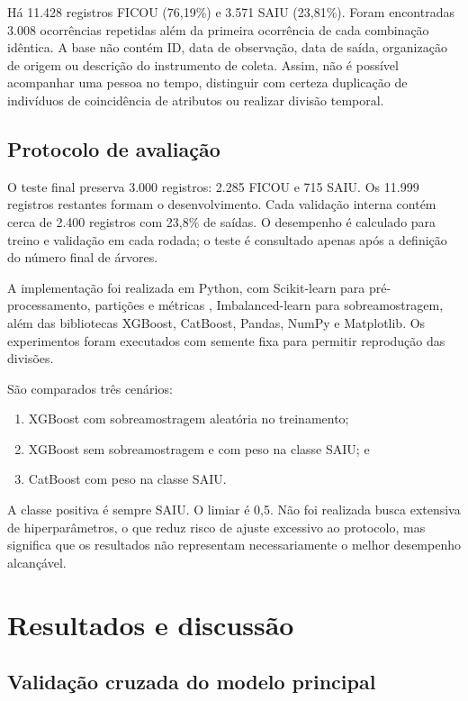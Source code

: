 \documentclass[12pt]{article}
\begin{document}
Há 11.428 registros FICOU (76,19\%) e 3.571 SAIU (23,81\%). Foram encontradas 3.008 ocorrências repetidas além da primeira ocorrência de cada combinação idêntica. A base não contém ID, data de observação, data de saída, organização de origem ou descrição do instrumento de coleta. Assim, não é possível acompanhar uma pessoa no tempo, distinguir com certeza duplicação de indivíduos de coincidência de atributos ou realizar divisão temporal.

\subsection{Protocolo de avaliação}

O teste final preserva 3.000 registros: 2.285 FICOU e 715 SAIU. Os 11.999 registros restantes formam o desenvolvimento. Cada validação interna contém cerca de 2.400 registros com 23,8\% de saídas. O desempenho é calculado para treino e validação em cada rodada; o teste é consultado apenas após a definição do número final de árvores.

A implementação foi realizada em Python, com Scikit-learn para pré-processamento, partições e métricas \cite{pedregosa2011scikit}, Imbalanced-learn para sobreamostragem, além das bibliotecas XGBoost, CatBoost, Pandas, NumPy e Matplotlib. Os experimentos foram executados com semente fixa para permitir reprodução das divisões.

São comparados três cenários:

\begin{enumerate}
    \item XGBoost com sobreamostragem aleatória no treinamento;
    \item XGBoost sem sobreamostragem e com peso na classe SAIU; e
    \item CatBoost com peso na classe SAIU.
\end{enumerate}

A classe positiva é sempre SAIU. O limiar é 0,5. Não foi realizada busca extensiva de hiperparâmetros, o que reduz risco de ajuste excessivo ao protocolo, mas significa que os resultados não representam necessariamente o melhor desempenho alcançável.

\section{Resultados e discussão}
\label{sec:resultados}

\subsection{Validação cruzada do modelo principal}
\end{document}
